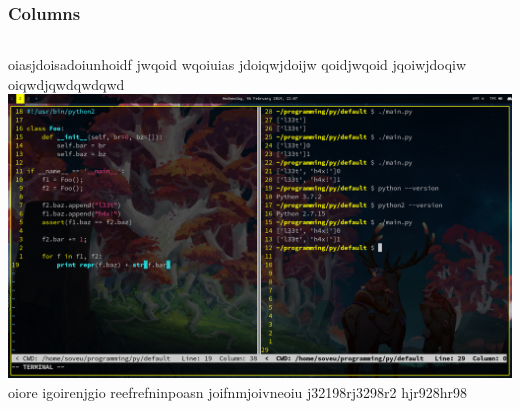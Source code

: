 \documentclass{beamer}
\begin{document}
\begin{frame}
\frametitle{Columns}
  \begin{columns}
oiasjdoisadoiunhoidf jwqoid wqoiuias jdoiqwjdoijw qoidjwqoid jqoiwjdoqiw oiqwdjqwdqwdqwd
\includegraphics[width=\textwidth]{pybug23.png}
oiore igoirenjgio reefrefninpoasn joifnmjoivneoiu j32198rj3298r2 hjr928hr98
  \end{columns}
\end{frame}
\end{document}
